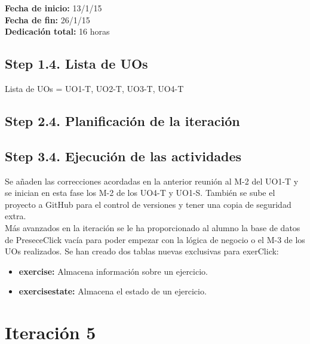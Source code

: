 \begin{flushleft}
\textbf{Fecha de inicio:} 13/1/15\\
\textbf{Fecha de fin:} 26/1/15\\
\textbf{Dedicación total:} 16 horas\\
\end{flushleft}

\subsection{Step 1.4. Lista de UOs}
\label{it4:1.4}

Lista de UOs = {UO1-T, UO2-T, UO3-T, UO4-T}

\subsection{Step 2.4. Planificación de la iteración}
\label{it4:2.4}

\subsection{Step 3.4. Ejecución de las actividades}
\label{it4:3.4}

Se añaden las correcciones acordadas en la anterior reunión al M-2 del UO1-T y se inician en esta fase los M-2 de los UO4-T y UO1-S. También se sube el proyecto a GitHub para el control de versiones y tener una copia de seguridad extra.\\

Más avanzados en la iteración se le ha proporcionado al alumno la base de datos de PreseceClick vacía para poder empezar con la lógica de negocio o el M-3 de los UOs realizados. Se han creado dos tablas nuevas exclusivas para exerClick:

\begin{itemize}
\item \textbf{exercise:} Almacena información sobre un ejercicio.
\item \textbf{exercisestate:} Almacena el estado de un ejercicio.
\end{itemize}


\section{Iteración 5}
\label{it4}


